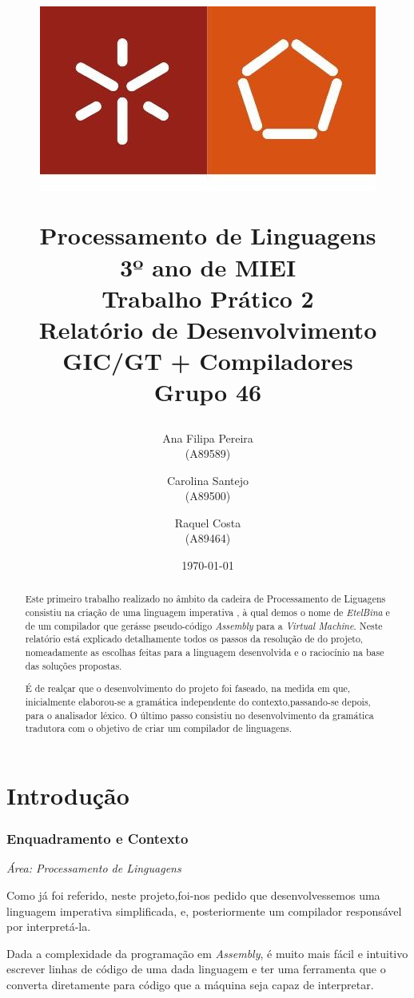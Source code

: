 \documentclass[11pt,a4paper]{report}
\title{

\begin{center}
\includegraphics[scale=0.3]{images/um}
\end{center}

Processamento de Linguagens \\
		3º ano de MIEI\\  \vspace{1cm}
       \textbf{Trabalho Prático 2}\\ 
			  \vspace{1cm} Relatório de Desenvolvimento \\
      GIC/GT + Compiladores\\ \vspace{2cm}
\large{Grupo 46}}
\author{ Ana Filipa Pereira\\ (A89589) \and Carolina Santejo\\ (A89500)
         \and Raquel Costa\\ (A89464)
       }
\date{\vspace{2cm}\today}
\begin{document}
\maketitle %




\begin{abstract}  %
Este primeiro trabalho realizado no âmbito da cadeira de Processamento de Liguagens consistiu na criação de uma linguagem imperativa , à qual demos o nome de \textit{EtelBina} e de um compilador que gerásse pseudo-código \textit{Assembly} para a \textit{Virtual Machine}.
Neste relatório está explicado detalhamente todos os passos da resolução de do projeto, nomeadamente as escolhas feitas para a linguagem desenvolvida e o raciocínio na base das soluções propostas.\par
É de realçar que o desenvolvimento do projeto foi faseado, na medida em que, inicialmente elaborou-se a gramática independente do contexto,passando-se depois, para o analisador léxico. O último passo consistiu no desenvolvimento da gramática tradutora com o objetivo de criar um compilador de linguagens.
\end{abstract}



\tableofcontents 

\listoffigures 




\chapter{Introdução} \label{chap:intro} 			%

\subsection{Enquadramento e Contexto}
\textit{Área: Processamento de Linguagens}\par
\vspace{2ex}
Como já foi referido, neste projeto,foi-nos pedido que desenvolvessemos uma linguagem imperativa simplificada, e, posteriormente um compilador responsável por interpretá-la. \par
Dada a complexidade da programação em \textit{Assembly}, é muito mais fácil e intuitivo escrever linhas de código de uma dada linguagem e ter uma ferramenta que o converta diretamente para código que a máquina seja capaz de interpretar.
\end{document}
